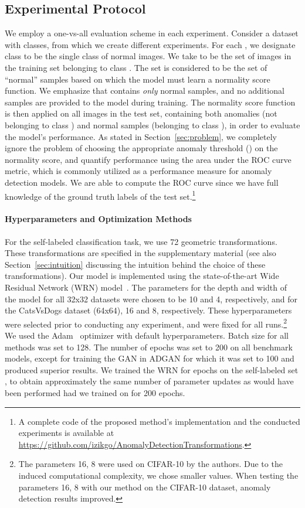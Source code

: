 \documentclass{article}
\begin{document}
	\subsection{Experimental Protocol}
	We employ a one-vs-all evaluation scheme in each experiment. Consider a dataset with  classes, from which we create  different experiments.
	For each , we designate class  to be the single class of normal images. We take  to be the set of images in the training set belonging to class .
The set  is considered to be the set of ``normal'' samples based on which the model must learn a normality score function. We emphasize that  contains {\em only} normal samples, and no additional samples are provided to the model during training. The normality score function is then applied on all images in the test set, containing both anomalies (not belonging to class ) and normal samples (belonging to class ), in order to evaluate the model's performance. As stated in Section~\ref{sec:problem}, we completely ignore the problem of choosing the appropriate anomaly threshold () on the normality score, and quantify performance using the area under the ROC curve metric, which is commonly utilized as a performance measure for anomaly detection models. We are able to compute the ROC curve since we have full knowledge of the ground truth labels of the test set.\footnote{A complete code of the proposed method's implementation and the conducted experiments is available at \url{https://github.com/izikgo/AnomalyDetectionTransformations}.}
	
	\paragraph{Hyperparameters and Optimization Methods}
	For the self-labeled classification task, we use 72 geometric transformations. These transformations are
	specified in the supplementary material (see also Section~\ref{sec:intuition} discussing the intuition
	behind the choice of these transformations). Our model is implemented using the state-of-the-art Wide Residual Network (WRN) model~\cite{zagoruyko2016WRN}. The parameters for the depth and width of the model for all 32x32 datasets were chosen to be 10 and 4, respectively, and for the CatsVsDogs dataset (64x64), 16 and 8, respectively. These hyperparameters were selected prior to conducting any experiment, and were fixed for all runs.\footnote{The parameters 16, 8 were used on CIFAR-10 by the authors. Due to the induced computational complexity, we chose smaller values. When testing the parameters 16, 8 with our method on the CIFAR-10 dataset, anomaly detection results improved.}
	We used the Adam~\cite{kingma2014adam} optimizer with default hyperparameters. Batch size for all methods was set to 128. The number of epochs was set to 200 on all benchmark models, except for training the GAN in ADGAN for which it was set to 100 and produced superior results. We trained the WRN for  epochs on the self-labeled set , to obtain approximately the same number of parameter updates as would have been performed had we trained on  for 200 epochs.
	
\end{document}
